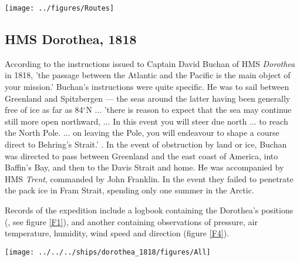 \documentclass[CP]{copernicus}
\begin{document}
\begin{figure*}[!hbp]
\begin{center}
\texttt{[image: ../figures/Routes]}
\caption{Routes of the Royal Navy expeditions providing new observations. Filled circles mark overwintering sites.}
\label{F1}
\end{center}
\end{figure*}

\subsection{HMS Dorothea, 1818}

According to the instructions issued to Captain David Buchan of HMS {\it Dorothea} in 1818, 'the passage between the Atlantic and the Pacific is the main object of your mission.' Buchan's instructions were quite specific. He was to sail between Greenland and Spitzbergen --- the seas around the latter having been generally free of ice as far as 84$^\circ$N ... 'there is reason to expect that the sea may continue still more open northward, ... In this event you will steer due north ... to reach the North Pole. ... on leaving the Pole, you will endeavour to shape a course direct to Behring's Strait.' \citep{buchan_1818}. In the event of obstruction by land or ice, Buchan was directed to pass between Greenland and the east coast of America, into Baffin's Bay, and then to the Davis Strait and home. He was accompanied by HMS {\it Trent}, commanded by John Franklin. In the event they failed to penetrate the pack ice in Fram Strait, spending only one summer in the Arctic.

Records of the expedition include a logbook containing the Dorothea's positions (\citet{dorothea_deck_log_1818}, see figure \ref{F1}), and another containing observations of pressure, air temperature, humidity, wind speed and direction \citep{dorothea_met_log_1818} (figure \ref{F4}).
\begin{figure*}[!hbp]
\begin{center}
\texttt{[image: ../../../ships/dorothea\_1818/figures/All]}
\caption{Weather observations from HMS {\it Dorothea}, compared with modern values. The red points are the expedition's observations, the black and grey lines are the mean, max and min values from modern datasets (monthly averages interpolated to daily, 1979-2004; sea-ice from \citet{rayner03HadISST1}, AT from \citet{rigor97poles}, and pressure from \citet{allan06meansealevelpressure}).}
\label{F4}
\end{center}
\end{figure*}
\end{document}
